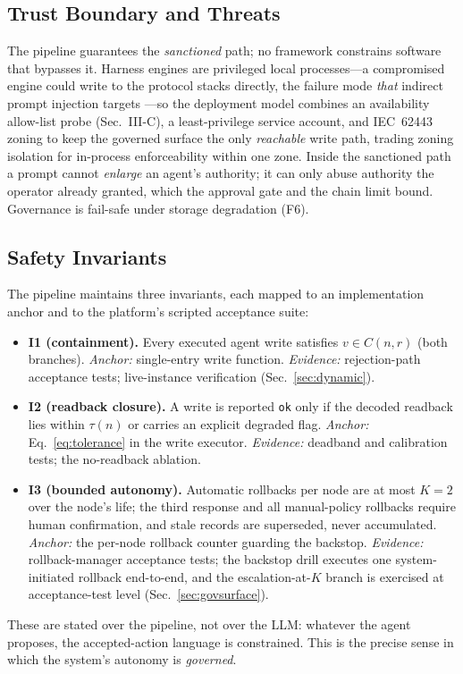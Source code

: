 \subsection{Trust Boundary and Threats}
The pipeline guarantees the \emph{sanctioned} path; no framework constrains software that bypasses it. Harness engines are privileged local processes---a compromised engine could write to the protocol stacks directly, the failure mode \emph{that} indirect prompt injection targets \cite{greshake2023injection}---so the deployment model combines an availability allow-list probe (Sec.~III-C), a least-privilege service account, and IEC~62443 zoning \cite{iec62443} to keep the governed surface the only \emph{reachable} write path, trading zoning isolation for in-process enforceability within one zone. Inside the sanctioned path a prompt cannot \emph{enlarge} an agent's authority; it can only abuse authority the operator already granted, which the approval gate and the chain limit bound. Governance is fail-safe under storage degradation (F6).

\subsection{Safety Invariants}
The pipeline maintains three invariants, each mapped to an implementation anchor and to the platform's scripted acceptance suite:
\begin{itemize}
\item \textbf{I1 (containment).} Every executed agent write satisfies $v \in C(n, r)$ (both branches). \emph{Anchor:} single-entry write function. \emph{Evidence:} rejection-path acceptance tests; live-instance verification (Sec.~\ref{sec:dynamic}).
\item \textbf{I2 (readback closure).} A write is reported \texttt{ok} only if the decoded readback lies within $\tau(n)$ or carries an explicit degraded flag. \emph{Anchor:} Eq.~\eqref{eq:tolerance} in the write executor. \emph{Evidence:} deadband and calibration tests; the no-readback ablation.
\item \textbf{I3 (bounded autonomy).} Automatic rollbacks per node are at most $K = 2$ over the node's life; the third response and all manual-policy rollbacks require human confirmation, and stale records are superseded, never accumulated. \emph{Anchor:} the per-node rollback counter guarding the backstop. \emph{Evidence:} rollback-manager acceptance tests; the backstop drill executes one system-initiated rollback end-to-end, and the escalation-at-$K$ branch is exercised at acceptance-test level (Sec.~\ref{sec:govsurface}).
\end{itemize}
These are stated over the pipeline, not over the LLM: whatever the agent proposes, the accepted-action language is constrained. This is the precise sense in which the system's autonomy is \emph{governed}.

